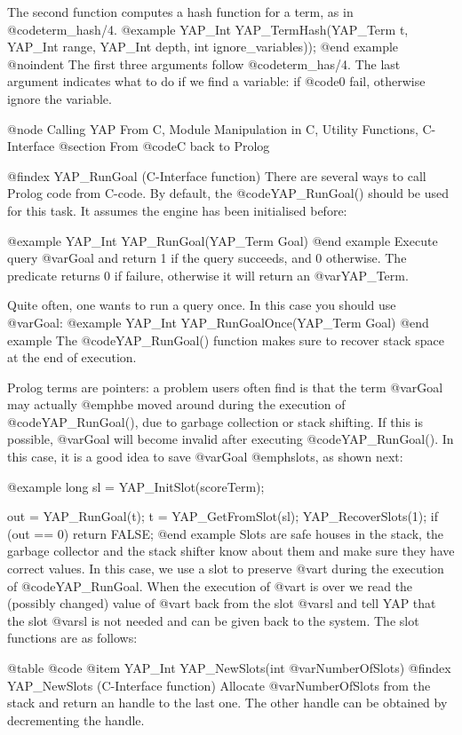 {{{{{{{{{The second function computes a hash function for a term, as in
@code{term_hash/4}.
@example
     YAP_Int    YAP_TermHash(YAP_Term t, YAP_Int range, YAP_Int depth, int  ignore_variables));
@end example
@noindent
The first three arguments follow @code{term_has/4}. The last argument
indicates what to do if we find a variable: if @code{0} fail, otherwise
ignore the variable. 

@node Calling YAP From C, Module Manipulation in C, Utility Functions, C-Interface
@section From @code{C} back to Prolog

@findex YAP_RunGoal (C-Interface function)
There are several ways to call Prolog code from C-code. By default, the
@code{YAP_RunGoal()} should be used for this task. It assumes the engine
has been initialised before:

@example
  YAP_Int YAP_RunGoal(YAP_Term Goal)
@end example
Execute query @var{Goal} and return 1 if the query succeeds, and 0
otherwise. The predicate returns 0 if failure, otherwise it will return
an @var{YAP_Term}. 

Quite often, one wants to run a query once. In this case you should use
@var{Goal}:
@example
  YAP_Int YAP_RunGoalOnce(YAP_Term Goal)
@end example
The  @code{YAP_RunGoal()} function makes sure to recover stack space at
the end of execution.

Prolog terms are pointers: a problem users often find is that the term
@var{Goal} may actually @emph{be moved around} during the execution of
@code{YAP_RunGoal()}, due to garbage collection or stack shifting. If
this is possible, @var{Goal} will become invalid after executing
@code{YAP_RunGoal()}. In this case, it is a good idea to save @var{Goal}
@emph{slots}, as shown next:

@example
  long sl = YAP_InitSlot(scoreTerm);

  out = YAP_RunGoal(t);
  t = YAP_GetFromSlot(sl);
  YAP_RecoverSlots(1);
  if (out == 0) return FALSE;
@end example
Slots are safe houses in the stack, the garbage collector and the stack
shifter know about them and make sure they have correct values. In this
case, we use a slot to preserve @var{t} during the execution of
@code{YAP_RunGoal}. When the execution of @var{t} is over we read the
(possibly changed) value of @var{t} back from the slot @var{sl} and tell
YAP that the slot @var{sl} is not needed and can be given back to the
system. The slot functions are as follows:

@table @code
@item YAP_Int YAP_NewSlots(int @var{NumberOfSlots})
@findex YAP_NewSlots (C-Interface function)
Allocate @var{NumberOfSlots} from the stack and return an handle to the
last one. The other handle can be obtained by decrementing the handle.

}}}}}}}}}
